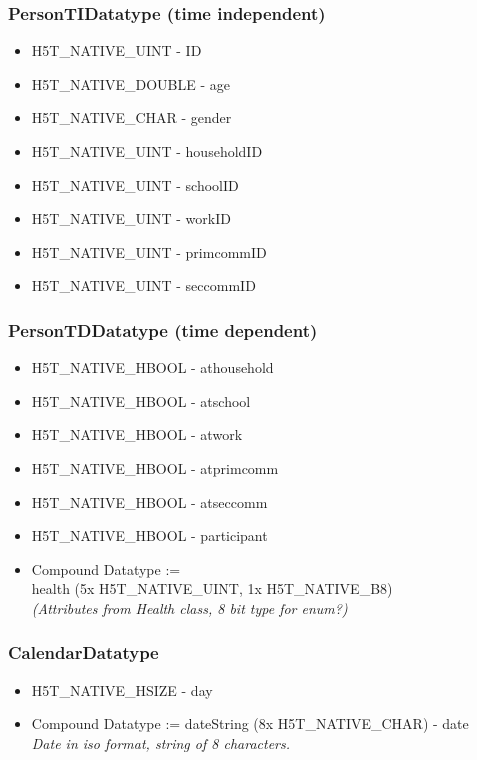 \documentclass{article}
\begin{document}
			\subsubsection{PersonTIDatatype (time independent)}
				\begin{itemize}
					\item H5T\_NATIVE\_UINT - ID
					\item H5T\_NATIVE\_DOUBLE - age
					\item H5T\_NATIVE\_CHAR - gender

					\item H5T\_NATIVE\_UINT - householdID
					\item H5T\_NATIVE\_UINT - schoolID
					\item H5T\_NATIVE\_UINT - workID
					\item H5T\_NATIVE\_UINT - primcommID
					\item H5T\_NATIVE\_UINT - seccommID
				\end{itemize}

			\subsubsection{PersonTDDatatype (time dependent)}
				\begin{itemize}
					\item H5T\_NATIVE\_HBOOL - athousehold
					\item H5T\_NATIVE\_HBOOL - atschool
					\item H5T\_NATIVE\_HBOOL - atwork
					\item H5T\_NATIVE\_HBOOL - atprimcomm
					\item H5T\_NATIVE\_HBOOL - atseccomm
					\item H5T\_NATIVE\_HBOOL - participant

					\item Compound Datatype := \\
						\hspace*{1cm} health (5x H5T\_NATIVE\_UINT, 1x H5T\_NATIVE\_B8) \\
						\textit{(Attributes from Health class, 8 bit type for enum?)}
				\end{itemize}

			\subsubsection{CalendarDatatype}
				\begin{itemize}
					\item H5T\_NATIVE\_HSIZE - day
					\item Compound Datatype := dateString (8x H5T\_NATIVE\_CHAR) - date
							\\ \textit{Date in iso format, string of 8 characters.}
				\end{itemize}
\end{document}
